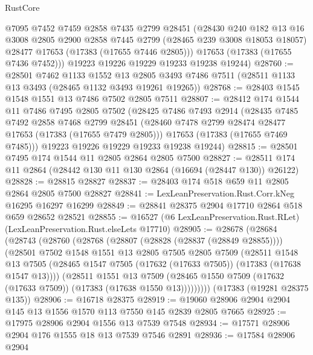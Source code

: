 \begin{lexlean}{RustCore}
\begin{coremodule}
        @7095
        @7452
        @7459
        @2858
        @7435
        @2799
        @28451
        (@28430
          @240
          @182
          @13
          @16
          @3008
          @2805
          @2900
          @2858
          @7445
          @2799
          (@28465 @239 @3008 @18053 @18057)
          @28477
          @17653
          (@17383 (@17655 @7446 @2805)))
        @17653
        (@17383 (@17655 @7436 @7452)))
      @19223
      @19226
      @19229
      @19233
      @19238
      @19244)
@28760 := @28501
    @7462
    @1133
    @1552
    @13
    @2805
    @3493
    @7486
    @7511
    (@28511 @1133 @13 @3493 (@28465 @1132 @3493 @19261 @19265))
@28768 := @28403 @1545 @1548 @1551 @13 @7486 @7502 @2805 @7511
@28807 := @28412
    @174
    @1544
    @11
    @7486
    @7495
    @2805
    @7502
    (@28425
      @7486
      @7493
      @2914
      (@28435
        @7485
        @7492
        @2858
        @7468
        @2799
        @28451
        (@28460 @7478 @2799 @28474 @28477 @17653 (@17383 (@17655 @7479 @2805)))
        @17653
        (@17383 (@17655 @7469 @7485)))
      @19223
      @19226
      @19229
      @19233
      @19238
      @19244)
@28815 := @28501 @7495 @174 @1544 @11 @2805 @2864 @2805 @7500
@28827 := @28511 @174 @11 @2864 (@28442 @130 @11 @130 @2864 (@16694 (@28447 @130)) @26122)
@28828 := @28815 @28827
@28837 := @28403 @174 @518 @659 @11 @2805 @2864 @2805 @7500 @28827
@28841 := LexLeanPreservation.Rust.Corr.kNeg @16295 @16297 @16299
@28849 := @28841 @28375 @2904 @17710 @2864 @518 @659 @28652 @28521
@28855 := @16527 (@6 LexLeanPreservation.Rust.RLet) (LexLeanPreservation.Rust.elseLets @17710)
@28905 := @28678
    (@28684
      (@28743
        (@28760
          (@28768
            (@28807 (@28828 (@28837 (@28849 @28855))))
            (@28501
              @7502
              @1548
              @1551
              @13
              @2805
              @7505
              @2805
              @7509
              (@28511
                @1548
                @13
                @7505
                (@28465 @1547 @7505 (@17632 (@17633 @7505)) (@17383 (@17638 @1547 @13))))
              (@28511
                @1551
                @13
                @7509
                (@28465 @1550 @7509 (@17632 (@17633 @7509)) (@17383 (@17638 @1550 @13)))))))))
    (@17383 (@19281 @28375 @135))
@28906 := @16718 @28375
@28919 := @19060 @28906 @2904 @2904 @145 @13 @1556 @1570 @113 @7550 @145 @2839 @2805 @7665
@28925 := @17975 @28906 @2904 @1556 @13 @7539 @7548
@28934 := @17571 @28906 @2904 @176 @1555 @18 @13 @7539 @7546 @2891
@28936 := @17584 @28906 @2904

\end{coremodule}
\end{lexlean}
